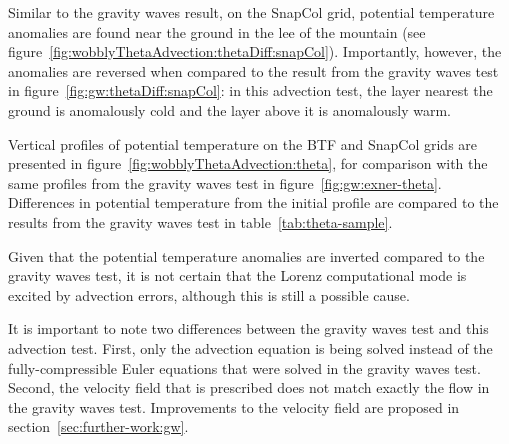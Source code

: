 Similar to the gravity waves result, on the SnapCol grid, potential temperature anomalies are found near the ground in the lee of the mountain (see figure~\ref{fig:wobblyThetaAdvection:thetaDiff:snapCol}).  Importantly, however, the anomalies are reversed when compared to the result from the gravity waves test in figure~\ref{fig:gw:thetaDiff:snapCol}: in this advection test, the layer nearest the ground is anomalously cold and the layer above it is anomalously warm.  

Vertical profiles of potential temperature on the BTF and SnapCol grids are presented in figure~\ref{fig:wobblyThetaAdvection:theta}, for comparison with the same profiles from the gravity waves test in figure~\ref{fig:gw:exner-theta}.
Differences in potential temperature from the initial profile are compared to the results from the gravity waves test in table~\ref{tab:theta-sample}.

Given that the potential temperature anomalies are inverted compared to the gravity waves test, it is not certain that the Lorenz computational mode is excited by advection errors, although this is still a possible cause.

It is important to note two differences between the gravity waves test and this advection test.  First, only the advection equation is being solved instead of the fully-compressible Euler equations that were solved in the gravity waves test.  Second, the velocity field that is prescribed does not match exactly the flow in the gravity waves test.  Improvements to the velocity field are proposed in section~\ref{sec:further-work:gw}.

